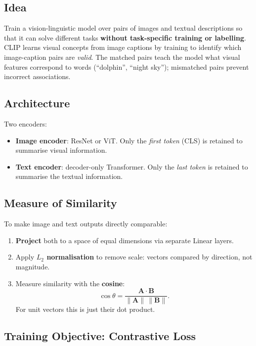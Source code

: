 \documentclass[11pt,a4paper]{article}
\theoremstyle{definition}
\theoremstyle{plain}
\theoremstyle{remark}
\begin{document}
\subsection{Idea}

Train a vision-linguistic model over pairs of images and textual descriptions so that it can solve different tasks \textbf{without task-specific training or labelling}. CLIP learns visual concepts from image captions by training to identify which image-caption pairs are \emph{valid}. The matched pairs teach the model what visual features correspond to words (``dolphin'', ``night sky''); mismatched pairs prevent incorrect associations.

\subsection{Architecture}

Two encoders:
\begin{itemize}
    \item \textbf{Image encoder}: ResNet or ViT. Only the \emph{first token} (CLS) is retained to summarise visual information.
    \item \textbf{Text encoder}: decoder-only Transformer. Only the \emph{last token} is retained to summarise the textual information.
\end{itemize}

\subsection{Measure of Similarity}

To make image and text outputs directly comparable:
\begin{enumerate}
    \item \textbf{Project} both to a space of equal dimensions via separate Linear layers.
    \item Apply \textbf{$L_2$ normalisation} to remove scale: vectors compared by direction, not magnitude.
    \item Measure similarity with the \textbf{cosine}:
    \[
        \cos\theta = \frac{\mathbf{A}\cdot\mathbf{B}}{\|\mathbf{A}\|\,\|\mathbf{B}\|}.
    \]
    For unit vectors this is just their dot product.
\end{enumerate}

\subsection{Training Objective: Contrastive Loss}
\end{document}
